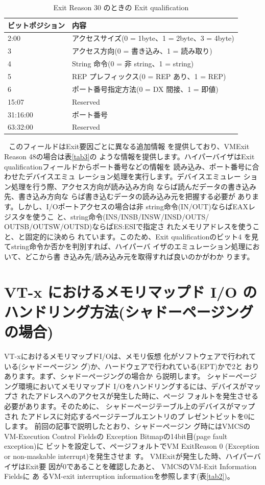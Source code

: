 \begin{table}\centering
\begin{tabular}{|l|l|} \hline

ビットポジション & 内容 \\
\hline
2:00 & アクセスサイズ(0 = 1byte、1 = 2byte、3 = 4byte) 	\\
\hline
3 & アクセス方向(0 = 書き込み、1 = 読み取り) 	\\
\hline
4 & String 命令(0 = 非 string、1 = string) 	\\
\hline
5 & REP プレフィックス(0 = REP あり、1 = REP) \\
\hline
6 & ポート番号指定方法(0 = DX 間接、1 = 即値) \\
\hline
15:07 & Reserved 	\\
\hline
31:16:00 & ポート番号 \\
\hline
63:32:00 & Reserved \\
\hline


\end{tabular}
\caption{Exit Reason 30 のときの Exit qualification}
\label{tab1}
\end{table}

 
 このフィールドはExit要因ごとに異なる追加情報
を提供しており、VMExit Reason 48の場合は表\ref{tab3}の
ような情報を提供します。ハイパーバイザはExit
qualificationフィールドからポート番号などの情報を
読み込み、ポート番号に合わせたデバイスエミュ
レーション処理を実行します。デバイスエミュレー
ション処理を行う際、アクセス方向が読み込み方向
ならば読んだデータの書き込み先、書き込み方向な
らば書き込むデータの読み込み元を把握する必要が
あります。しかし、I/Oポートアクセスの場合は非
string命令(IN/OUT)ならばEAXレジスタを使うこ
と、string命令(INS/INSB/INSW/INSD/OUTS/
OUTSB/OUTSW/OUTSD)ならばES:ESIで指定さ
れたメモリアドレスを使うこと、と固定的に決めら
れています。このため、Exit qualificationのビット4
を見てstring命令か否かを判別すれば、ハイパーバ
イザのエミュレーション処理において、どこから書
き込み先/読み込み元を取得すれば良いのかがわか
ります。


\section{VT-x におけるメモリマップド I/O のハンドリング方法(シャドーページングの場合)}

 VT-xにおけるメモリマップドI/Oは、メモリ仮想
化がソフトウェアで行われている(シャドーページン
グ)か、ハードウェアで行われている(EPT)かで2と
おりあります。まず、シャドーページングの場合か
ら説明します。
 シャドーページング環境においてメモリマップド
I/Oをハンドリングするには、デバイスがマップさ
れたアドレスへのアクセスが発生した時に、ページ
フォルトを発生させる必要があります。そのために、
シャドーページテーブル上のデバイスがマップされ
たアドレスに対応するページテーブルエントリのプ
レゼントビットを0にします。
 前回の記事で説明したとおり、シャドーページン
グ時にはVMCSのVM-Execution Control Fieldsの
Exception Bitmapの14bit目(page fault exception)に
ビットを設定して、ページフォルトでVM ExitReason
0 (Exception or non-maskable interrupt)を発生させま
す。 VMExitが発生した時、ハイパーバイザはExit要
因が0であることを確認したあと、 VMCSのVM-Exit
Information Fieldsに あ るVM-exit interruption
informationを参照します(表\ref{tab2})。

